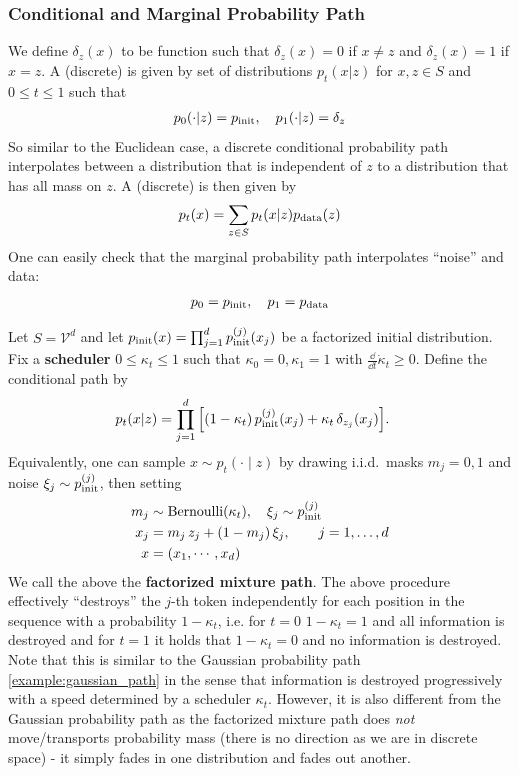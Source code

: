 \subsubsection{Conditional and Marginal Probability Path}
We define $\delta_{z}(x)$ to be function such that $\delta_{z}(x)=0$ if $x\neq z$ and $\delta_{z}(x)=1$ if $x=z$. A (discrete)  is given by set of  distributions $p_t(x|z)$ for $x,z\in S$ and $0\leq t\leq 1$ such that 
\begin{align*}
p_0(\cdot|z)=p_{\rm{init}}, \quad p_1(\cdot|z)=\delta_{z}
\end{align*}
So similar to the Euclidean case, a discrete conditional probability path interpolates between a distribution that is independent of $z$ to a distribution that has all mass on $z$. A (discrete)  is then given by
\begin{align*}
p_t(x)=\sum\limits_{z\in S}p_t(x|z)p_{\rm{data}}(z)
\end{align*}
One can easily check that the marginal probability path interpolates ``noise'' and data:
\begin{align}
\label{eq:discrete_prob_path_interpolation}
    p_0=p_{\rm{init}}, \quad p_1=p_{\rm{data}}
\end{align}
\begin{examplebox}
\label{example:factorized_mixture_path}
Let $S=\mathcal{V}^d$ and let $p_{\rm{init}}(x)=\prod_{j=1}^d p_{\rm{init}}^{(j)}(x_j)$ be a factorized initial distribution.
Fix a \textbf{scheduler} $0\le \kappa_t\le 1$ such that $\kappa_{0}=0,\kappa_{1}=1$ with $\frac{\dd}{\dd t}\dot{\kappa}_t\geq 0$. Define the conditional path by
\begin{align*}
p_t(x|z)
&=\prod_{j=1}^d\Big[(1-\kappa_t)\,p_{\rm{init}}^{(j)}(x_j)+\kappa_t\,\delta_{z_j}(x_j)\Big].
\end{align*}
Equivalently, one can sample $x\sim p_t(\cdot\mid z)$ by drawing i.i.d.\ masks $m_j=0,1$ and noise $\xi_j\sim p_{\rm{init}}^{(j)}$, then setting
\begin{align*}
m_j&\sim\mathrm{Bernoulli}(\kappa_t), \quad \xi_j\sim p_{\rm{init}}^{(j)}\\
x_j &= m_j\, z_j + (1-m_j)\,\xi_j,\qquad j=1,\dots,d\\
x&=(x_1,\cdots,x_d)
\end{align*}
We call the above the \textbf{factorized mixture path}. The above procedure effectively ``destroys'' the $j$-th token independently for each position in the sequence with a probability $1-\kappa_{t}$, i.e. for $t=0$ $1-\kappa_{t}=1$ and all information is destroyed and for $t=1$ it holds that $1-\kappa_{t}=0$ and no information is destroyed. Note that this is similar to the Gaussian probability path \cref{example:gaussian_path} in the sense that information is destroyed progressively with a speed determined by a scheduler $\kappa_{t}$. However, it is also different from the Gaussian probability path as the factorized mixture path does \emph{not} move/transports probability mass (there is no direction as we are in discrete space) - it simply fades in one distribution and fades out another.
\end{examplebox}


